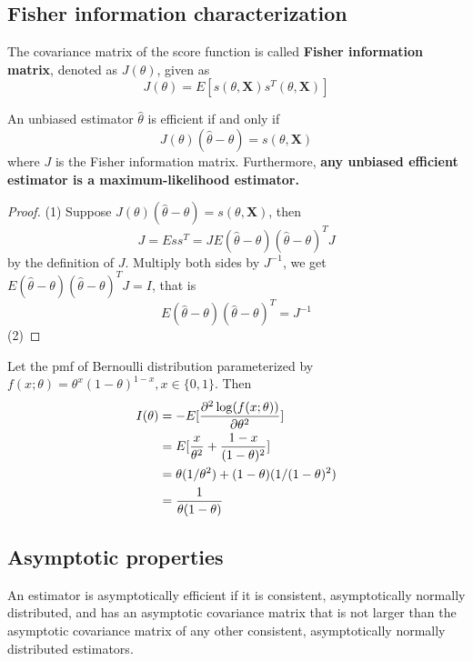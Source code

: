 \begin{refsection}
\subsection{Fisher information characterization}
\begin{definition}
The covariance matrix of the score function is called \textbf{Fisher information matrix}, denoted as $J(\theta)$, given as
$$J(\theta) = E[s(\theta,\bm{X})s^T(\theta,\bm{X})]$$
\end{definition}


\begin{theorem}\cite[552]{moon2000mathematical}
	An unbiased estimator $\hat{\theta}$ is efficient if and only if 
	$$J(\theta)(\hat{\theta}-\theta) = s(\theta,\bm{X})$$
	where $J$ is the Fisher information matrix.
	Furthermore, \textbf{any unbiased efficient estimator is a maximum-likelihood estimator.}
\end{theorem}
\begin{proof}
(1) Suppose $J(\theta)(\hat{\theta}-\theta) = s(\theta,\bm{X})$, then $$J = Ess^T = JE(\hat{\theta}-\theta)(\hat{\theta}-\theta)^T J$$
by the definition of $J$. Multiply both sides by $J^{-1}$, we get $E(\hat{\theta}-\theta)(\hat{\theta}-\theta)^T J = I$, that is
$$E(\hat{\theta}-\theta)(\hat{\theta}-\theta)^T = J^{-1}$$
(2)

\end{proof}

\begin{example}
	Let the pmf of Bernoulli distribution parameterized by $f(x;\theta) = \theta^x(1-\theta)^{1-x},x\in\{0,1\}$. Then
\begin{align*}
I(\theta) &= -E[\frac{\partial^2 \log(f(x;\theta))}{\partial \theta^2}] \\
&= E[\frac{x}{\theta^2} + \frac{1-x}{(1-\theta)^2}]\\
&= \theta (1/\theta^2) + (1-\theta)(1/(1-\theta)^2) \\
&= \frac{1}{\theta(1-\theta)}
\end{align*}
\end{example}



\subsection{Asymptotic properties}

\begin{definition}\cite[542]{greene2017econometric}
An estimator is asymptotically efficient if it is consistent, asymptotically normally distributed, and has an asymptotic covariance matrix that is not larger than the asymptotic covariance matrix of any other consistent, asymptotically normally distributed estimators.	
\end{definition}



\end{refsection}
